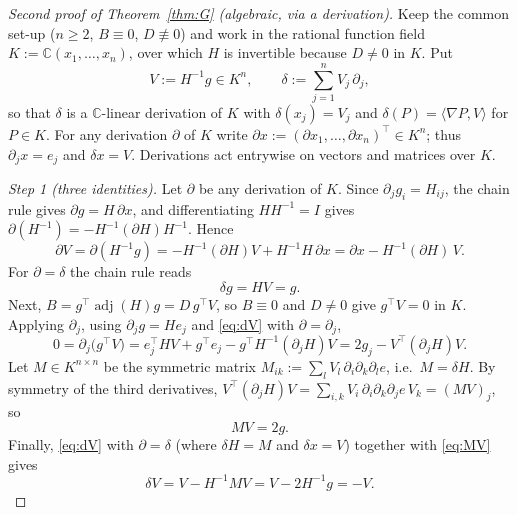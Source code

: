 \documentclass[11pt]{article}
\theoremstyle{plain}
\theoremstyle{definition}
\newcommand{\C}{\mathbb{C}}
\newcommand{\adj}{\operatorname{adj}}
\begin{document}
\begin{proof}[Second proof of Theorem~\ref{thm:G} (algebraic, via a
derivation)]
Keep the common set-up ($n\ge2$, $B\equiv0$, $D\not\equiv0$) and work in
the rational function field $K:=\C(x_1,\dots,x_n)$, over which $H$ is
invertible because $D\ne0$ in $K$. Put
\[
V:=H^{-1}g\in K^n,\qquad \delta:=\sum_{j=1}^nV_j\,\partial_j ,
\]
so that $\delta$ is a $\C$-linear derivation of $K$ with
$\delta(x_j)=V_j$ and $\delta(P)=\langle\nabla P,V\rangle$ for $P\in K$.
For any derivation $\partial$ of $K$ write
$\partial x:=(\partial x_1,\dots,\partial x_n)^{\top}\in K^n$; thus
$\partial_jx=e_j$ and $\delta x=V$. Derivations act entrywise on
vectors and matrices over $K$.

\emph{Step 1 (three identities).} Let $\partial$ be any derivation of
$K$. Since $\partial_jg_i=H_{ij}$, the chain rule gives
$\partial g=H\,\partial x$, and differentiating $HH^{-1}=I$ gives
$\partial(H^{-1})=-H^{-1}(\partial H)H^{-1}$. Hence
\begin{equation}\label{eq:dV}
\partial V=\partial(H^{-1}g)=-H^{-1}(\partial H)V+H^{-1}H\,\partial x
=\partial x-H^{-1}(\partial H)\,V .
\end{equation}
For $\partial=\delta$ the chain rule reads
\begin{equation}\label{eq:dg}
\delta g=HV=g .
\end{equation}
Next, $B=g^{\top}\adj(H)g=D\,g^{\top}V$, so $B\equiv0$ and $D\ne0$ give
$g^{\top}V=0$ in $K$. Applying $\partial_j$, using $\partial_jg=He_j$ and
\eqref{eq:dV} with $\partial=\partial_j$,
\[
0=\partial_j\bigl(g^{\top}V\bigr)
=e_j^{\top}HV+g^{\top}e_j-g^{\top}H^{-1}(\partial_jH)V
=2g_j-V^{\top}(\partial_jH)V .
\]
Let $M\in K^{n\times n}$ be the symmetric matrix
$M_{ik}:=\sum_lV_l\,\partial_i\partial_k\partial_le$, i.e.\ $M=\delta H$.
By symmetry of the third derivatives,
$V^{\top}(\partial_jH)V=\sum_{i,k}V_i\,\partial_i\partial_k\partial_je\,V_k
=(MV)_j$, so
\begin{equation}\label{eq:MV}
MV=2g .
\end{equation}
Finally, \eqref{eq:dV} with $\partial=\delta$ (where $\delta H=M$ and
$\delta x=V$) together with \eqref{eq:MV} gives
\begin{equation}\label{eq:dVV}
\delta V=V-H^{-1}MV=V-2H^{-1}g=-V .
\end{equation}


\end{proof}
\end{document}
